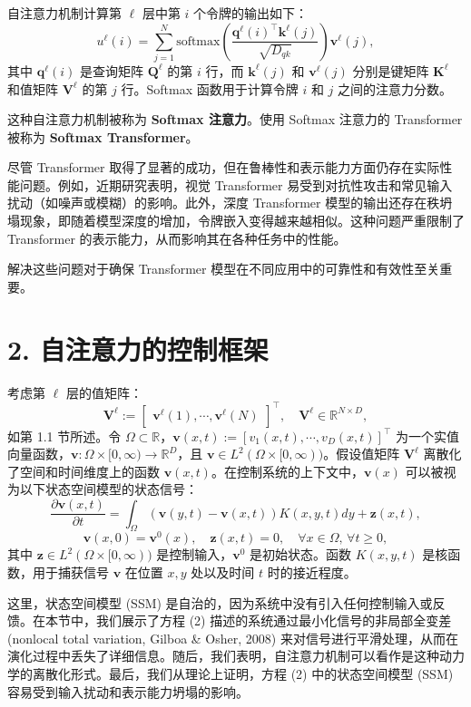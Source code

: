 \documentclass[lang=cn,a4paper,newtx]{elegantpaper}
\begin{document}
自注意力机制计算第 $\ell$ 层中第 $i$ 个令牌的输出如下：
\[
u^{\ell}(i) = \sum_{j=1}^N \text{softmax}\left( 
\frac{\mathbf{q}^{\ell}(i)^\top \mathbf{k}^{\ell}(j)}{\sqrt{D_{qk}}}
\right) \mathbf{v}^{\ell}(j),
\]
其中 $\mathbf{q}^{\ell}(i)$ 是查询矩阵 $\mathbf{Q}^{\ell}$ 的第 $i$ 行，而 $\mathbf{k}^{\ell}(j)$ 和 $\mathbf{v}^{\ell}(j)$ 分别是键矩阵 $\mathbf{K}^{\ell}$ 和值矩阵 $\mathbf{V}^{\ell}$ 的第 $j$ 行。Softmax 函数用于计算令牌 $i$ 和 $j$ 之间的注意力分数。

这种自注意力机制被称为 \textbf{Softmax 注意力}。使用 Softmax 注意力的 Transformer 被称为 \textbf{Softmax Transformer}。

尽管 Transformer 取得了显著的成功，但在鲁棒性和表示能力方面仍存在实际性能问题。例如，近期研究表明，视觉 Transformer 易受到对抗性攻击和常见输入扰动（如噪声或模糊）的影响。此外，深度 Transformer 模型的输出还存在秩坍塌现象，即随着模型深度的增加，令牌嵌入变得越来越相似。这种问题严重限制了 Transformer 的表示能力，从而影响其在各种任务中的性能。

解决这些问题对于确保 Transformer 模型在不同应用中的可靠性和有效性至关重要。

\section*{2. 自注意力的控制框架}

考虑第 $\ell$ 层的值矩阵：
\[
\mathbf{V}^{\ell} := 
\begin{bmatrix}
\mathbf{v}^{\ell}(1), \cdots, \mathbf{v}^{\ell}(N)
\end{bmatrix}^\top, \quad 
\mathbf{V}^{\ell} \in \mathbb{R}^{N \times D},
\]
如第 1.1 节所述。令 $\Omega \subset \mathbb{R}$，$\mathbf{v}(x, t) := [v_1(x, t), \cdots, v_D(x, t)]^\top$ 为一个实值向量函数，$\mathbf{v} : \Omega \times [0, \infty) \to \mathbb{R}^D$，且 $\mathbf{v} \in L^2(\Omega \times [0, \infty))$。假设值矩阵 $\mathbf{V}^\ell$ 离散化了空间和时间维度上的函数 $\mathbf{v}(x, t)$。在控制系统的上下文中，$\mathbf{v}(x)$ 可以被视为以下状态空间模型的状态信号：
\[
\frac{\partial \mathbf{v}(x, t)}{\partial t} = 
\int_\Omega (\mathbf{v}(y, t) - \mathbf{v}(x, t)) K(x, y, t) dy + \mathbf{z}(x, t),
\]
\[
\mathbf{v}(x, 0) = \mathbf{v}^0(x), \quad 
\mathbf{z}(x, t) = 0, \quad \forall x \in \Omega, \, \forall t \geq 0,
\]
其中 $\mathbf{z} \in L^2(\Omega \times [0, \infty))$ 是控制输入，$\mathbf{v}^0$ 是初始状态。函数 $K(x, y, t)$ 是核函数，用于捕获信号 $\mathbf{v}$ 在位置 $x, y$ 处以及时间 $t$ 时的接近程度。

这里，状态空间模型 (SSM) 是自治的，因为系统中没有引入任何控制输入或反馈。在本节中，我们展示了方程 (2) 描述的系统通过最小化信号的非局部全变差 (nonlocal total variation, Gilboa \& Osher, 2008) 来对信号进行平滑处理，从而在演化过程中丢失了详细信息。随后，我们表明，自注意力机制可以看作是这种动力学的离散化形式。最后，我们从理论上证明，方程 (2) 中的状态空间模型 (SSM) 容易受到输入扰动和表示能力坍塌的影响。
\end{document}
